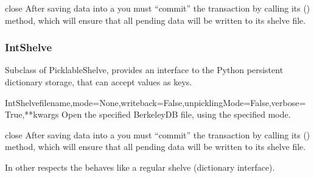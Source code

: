 \documentclass{howto}
\begin{document}
\begin{funcdesc}{close}{}
  After saving data into a  you must ``commit'' the transaction
  by calling its () method, which will ensure that all pending data
  will be written to its shelve file.
\end{funcdesc}

\subsubsection{IntShelve}
Subclass of PicklableShelve,
provides an interface to the Python  persistent dictionary
storage, that can accept  values as keys.
\begin{funcdesc}{IntShelve}{filename,mode=None,writeback=False,unpicklingMode=False,verbose=True,**kwargs}
  Open the specified  BerkeleyDB file, using the specified
  mode.
\end{funcdesc}

\begin{funcdesc}{close}{}
  After saving data into a  you must ``commit'' the transaction
  by calling its () method, which will ensure that all pending data
  will be written to its shelve file.
\end{funcdesc}
In other respects the  behaves like a regular shelve
(dictionary interface).





\end{document}
